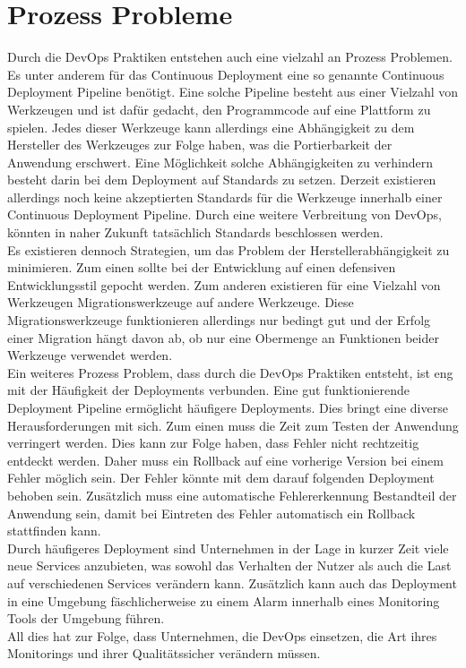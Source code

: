 \section{Prozess Probleme}
Durch die DevOps Praktiken entstehen auch eine vielzahl an Prozess Problemen. Es unter anderem für das Continuous Deployment eine so genannte Continuous Deployment Pipeline benötigt. Eine solche Pipeline besteht aus einer Vielzahl von Werkzeugen und ist dafür gedacht, den Programmcode auf eine Plattform zu spielen. Jedes dieser Werkzeuge kann allerdings eine Abhängigkeit zu dem Hersteller des Werkzeuges zur Folge haben, was die Portierbarkeit der Anwendung erschwert. Eine Möglichkeit solche Abhängigkeiten zu verhindern besteht darin bei dem Deployment auf Standards zu setzen. Derzeit existieren allerdings noch keine akzeptierten Standards für die Werkzeuge innerhalb einer Continuous Deployment Pipeline. Durch eine weitere Verbreitung von DevOps, könnten in naher Zukunft tatsächlich Standards beschlossen werden. \\
Es existieren dennoch Strategien, um das Problem der Herstellerabhängigkeit zu minimieren. Zum einen sollte bei der Entwicklung auf einen defensiven Entwicklungsstil gepocht werden. Zum anderen existieren für eine Vielzahl von Werkzeugen Migrationswerkzeuge auf andere Werkzeuge. Diese Migrationswerkzeuge funktionieren allerdings nur bedingt gut und der Erfolg einer Migration hängt davon ab, ob nur eine Obermenge an Funktionen beider Werkzeuge verwendet werden. \\
Ein weiteres Prozess Problem, dass durch die DevOps Praktiken entsteht, ist eng mit der Häufigkeit der Deployments verbunden. Eine gut funktionierende Deployment Pipeline ermöglicht häufigere Deployments. Dies bringt eine diverse Herausforderungen mit sich. Zum einen muss die Zeit zum Testen der Anwendung verringert werden. Dies kann zur Folge haben, dass Fehler nicht rechtzeitig entdeckt werden. Daher muss ein Rollback auf eine vorherige Version bei einem Fehler möglich sein. Der Fehler könnte mit dem darauf folgenden Deployment behoben sein. Zusätzlich muss eine automatische Fehlererkennung Bestandteil der Anwendung sein, damit bei Eintreten des Fehler automatisch ein Rollback stattfinden kann. \\
Durch häufigeres Deployment sind Unternehmen in der Lage in kurzer Zeit viele neue Services anzubieten, was sowohl das Verhalten der Nutzer als auch die Last auf verschiedenen Services verändern kann. Zusätzlich kann auch das Deployment in eine Umgebung fäschlicherweise zu einem Alarm innerhalb eines Monitoring Tools der Umgebung führen. \\
All dies hat zur Folge, dass Unternehmen, die DevOps einsetzen, die Art ihres Monitorings und ihrer Qualitätssicher verändern müssen.

